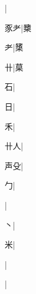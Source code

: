 \begin{multicols}{2}
{{}|{}\par
{\cjk{}{\cnsym{}　}豕耂}|{\cjk{}櫫}\par
{耂}|{\cjk{}橥}\par
{\cjk{}{\cnsym{}　}{\cnsym{}　}卄}|{\cjk{}菒}\par
{\cjk{}{\cnsym{}　}{\cnsym{}　}石}|{}\par
{\cjk{}{\cnsym{}　}{\cnsym{}　}日}|{}\par
{\cjk{}{\cnsym{}　}{\cnsym{}　}禾}|{}\par
{\cjk{}{\cnsym{}　}卄人}|{}\par
{\cjk{}{\cnsym{}　}声殳}|{}\par
{勹}|{}\par
{}|{}\par
{丶}|{}\par
{\cjk{}{\cnsym{}　}{\cnsym{}　}米}|{}\par
{\cjk{}{\cnsym{}　}{\cnsym{}　}{\cnsym{}　}}|{}\par
{\cjk{}{\cnsym{}　}{\cnsym{}　}{\cnsym{}　}}|{}\par
}
\end{multicols}
